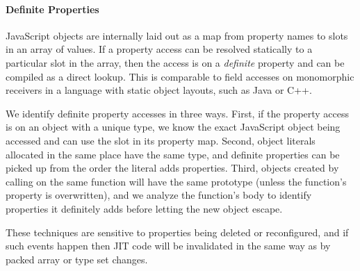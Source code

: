 \paragraph{Definite Properties}
\label{sec:definite-properties}

JavaScript objects are internally laid out as a map from property names
to slots in an array of values.
If a property access can be resolved statically to a particular slot in the
array, then the access is on a {\it definite} property and can be compiled
as a direct lookup. This is comparable to
field accesses on monomorphic receivers in a language with static object layouts,
such as Java or C++.

We identify definite property accesses in three ways.
First, if the property access is on an object with a unique type,
we know the exact JavaScript object being accessed and can use the slot
in its property map.
Second, object literals allocated in the same place have the same type,
and definite properties can be picked up from the order the literal
adds properties.
Third, objects created by calling  on the same function will have the
same prototype (unless the function's  property is overwritten),
and we analyze the function's body to identify properties it definitely
adds before letting the new object escape.

These techniques are sensitive to properties being deleted or
reconfigured, and if such events happen then JIT code will be invalidated
in the same way as by packed array or type set changes.

